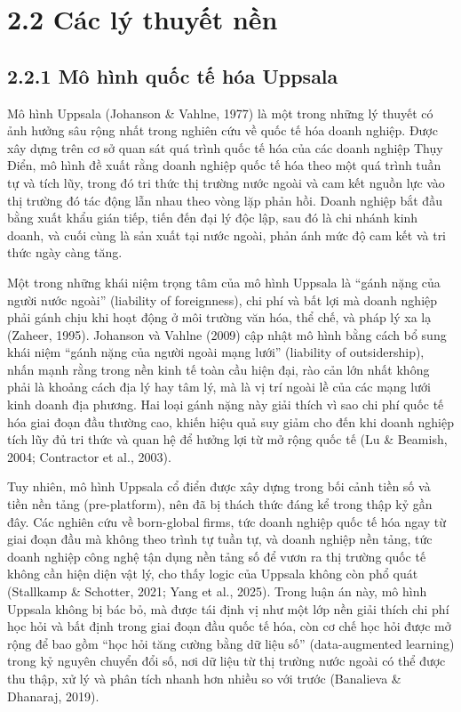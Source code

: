 \documentclass[
  a4paper,
  13pt]{extreport}
\begin{document}
\hypertarget{cuxe1c-luxfd-thuyux1ebft-nux1ec1n}{%
\section{2.2 Các lý thuyết
nền}\label{cuxe1c-luxfd-thuyux1ebft-nux1ec1n}}

\hypertarget{muxf4-huxecnh-quux1ed1c-tux1ebf-huxf3a-uppsala}{%
\subsection{2.2.1 Mô hình quốc tế hóa
Uppsala}\label{muxf4-huxecnh-quux1ed1c-tux1ebf-huxf3a-uppsala}}

Mô hình Uppsala (Johanson \& Vahlne, 1977) là một trong những lý thuyết
có ảnh hưởng sâu rộng nhất trong nghiên cứu về quốc tế hóa doanh nghiệp.
Được xây dựng trên cơ sở quan sát quá trình quốc tế hóa của các doanh
nghiệp Thụy Điển, mô hình đề xuất rằng doanh nghiệp quốc tế hóa theo một
quá trình tuần tự và tích lũy, trong đó tri thức thị trường nước ngoài
và cam kết nguồn lực vào thị trường đó tác động lẫn nhau theo vòng lặp
phản hồi. Doanh nghiệp bắt đầu bằng xuất khẩu gián tiếp, tiến đến đại lý
độc lập, sau đó là chi nhánh kinh doanh, và cuối cùng là sản xuất tại
nước ngoài, phản ánh mức độ cam kết và tri thức ngày càng tăng.

Một trong những khái niệm trọng tâm của mô hình Uppsala là ``gánh nặng
của người nước ngoài'' (liability of foreignness), chi phí và bất lợi mà
doanh nghiệp phải gánh chịu khi hoạt động ở môi trường văn hóa, thể chế,
và pháp lý xa lạ (Zaheer, 1995). Johanson và Vahlne (2009) cập nhật mô
hình bằng cách bổ sung khái niệm ``gánh nặng của người ngoài mạng lưới''
(liability of outsidership), nhấn mạnh rằng trong nền kinh tế toàn cầu
hiện đại, rào cản lớn nhất không phải là khoảng cách địa lý hay tâm lý,
mà là vị trí ngoài lề của các mạng lưới kinh doanh địa phương. Hai loại
gánh nặng này giải thích vì sao chi phí quốc tế hóa giai đoạn đầu thường
cao, khiến hiệu quả suy giảm cho đến khi doanh nghiệp tích lũy đủ tri
thức và quan hệ để hưởng lợi từ mở rộng quốc tế (Lu \& Beamish, 2004;
Contractor et al., 2003).

Tuy nhiên, mô hình Uppsala cổ điển được xây dựng trong bối cảnh tiền số
và tiền nền tảng (pre-platform), nên đã bị thách thức đáng kể trong thập
kỷ gần đây. Các nghiên cứu về born-global firms, tức doanh nghiệp quốc
tế hóa ngay từ giai đoạn đầu mà không theo trình tự tuần tự, và doanh
nghiệp nền tảng, tức doanh nghiệp công nghệ tận dụng nền tảng số để vươn
ra thị trường quốc tế không cần hiện diện vật lý, cho thấy logic của
Uppsala không còn phổ quát (Stallkamp \& Schotter, 2021; Yang et al.,
2025). Trong luận án này, mô hình Uppsala không bị bác bỏ, mà được tái
định vị như một lớp nền giải thích chi phí học hỏi và bất định trong
giai đoạn đầu quốc tế hóa, còn cơ chế học hỏi được mở rộng để bao gồm
``học hỏi tăng cường bằng dữ liệu số'' (data-augmented learning) trong
kỷ nguyên chuyển đổi số, nơi dữ liệu từ thị trường nước ngoài có thể
được thu thập, xử lý và phân tích nhanh hơn nhiều so với trước
(Banalieva \& Dhanaraj, 2019).
\end{document}
